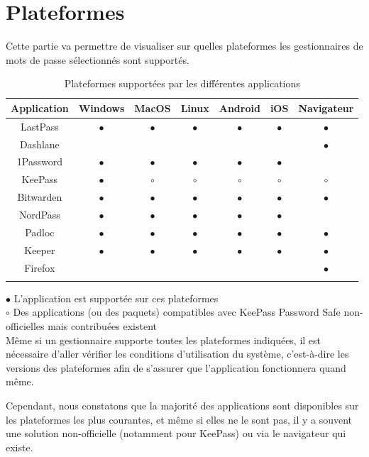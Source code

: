 \section{Plateformes}
Cette partie va permettre de visualiser sur quelles plateformes les gestionnaires de mots de passe sélectionnés sont supportés. \\
\begin{longtable}[H]{|c|c|c|c|c|c|c|}
	\hline
	Application & Windows & MacOS & Linux & Android & iOS & Navigateur  \\
	\hline
	LastPass & $\bullet$ & $\bullet$ & $\bullet$ & $\bullet$ & $\bullet$ &  $\bullet$\\
		\hline
	Dashlane & &  &  &&  & $\bullet$  \\
		\hline
	1Password & $\bullet$ & $\bullet$ & $\bullet$ & $\bullet$ & $\bullet$& \\
	\hline
	KeePass & $\bullet$ & $\circ$ & $\circ$  & $\circ$ & $\circ$ &  $\circ$  \\
		\hline
	Bitwarden & $\bullet$ & $\bullet$  & $\bullet$ & $\bullet$ & $\bullet$ & $\bullet$  \\
		\hline
	NordPass & $\bullet$ & $\bullet$ & $\bullet$  & $\bullet$ & $\bullet$ &  \\
		\hline
	Padloc & $\bullet$ & $\bullet$ & $\bullet$ & $\bullet$ & $\bullet$ & $\bullet$ \\
		\hline
	Keeper & $\bullet$ & $\bullet$ & $\bullet$ & $\bullet$ &$\bullet$ & $\bullet$ \\
		\hline
	Firefox & &  &  &&  & $\bullet$  \\
		\hline
	\caption{Plateformes supportées par les différentes applications}
\end{longtable}

$\bullet$ L'application est supportée sur ces plateformes \\
$\circ$  Des applications (ou des paquets) compatibles avec KeePass Password Safe non-officielles mais contribuées existent \\

Même si un gestionnaire supporte toutes les plateformes indiquées, il est nécessaire d'aller vérifier les conditions d'utilisation du système, c'est-à-dire les versions des plateformes afin de s'assurer que l'application fonctionnera quand même. 

Cependant, nous constatons que la majorité des applications sont disponibles sur les plateformes les plus courantes, et même si elles ne le sont pas, il y a souvent une solution non-officielle (notamment pour KeePass) ou via le navigateur qui existe.
